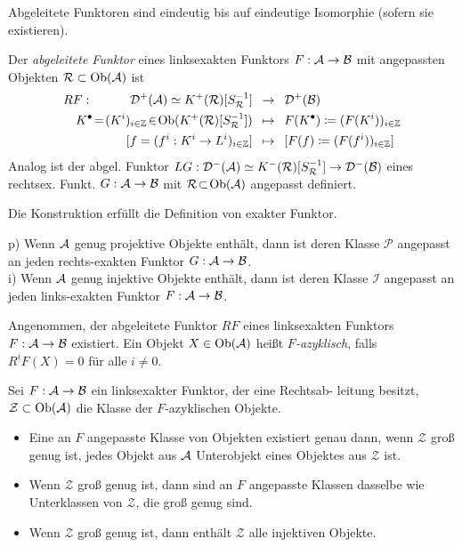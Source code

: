 \documentclass{cheat-sheet}
\newcommand{\CCC}[1]{{#1}^{\bullet}} %
\newcommand{\Inj}{\mathcal{I}} %
\newcommand{\Proj}{\mathcal{P}} %
\newcommand{\Ada}{\mathcal{R}} %
\begin{document}
\begin{bem}
  Abgeleitete Funktoren sind eindeutig bis auf eindeutige Isomorphie (sofern sie existieren).
\end{bem}

\begin{konstr}
  Der \emph{abgeleitete Funktor} eines linksexakten Funktors $F : \mathcal{A} \to \mathcal{B}$ mit angepassten Objekten $\Ada \subset \Ob(\Aat)$ ist
  \begin{align*}
    RF : \qquad \quad \Der^+(\Aat) \simeq K^+(\Ada)[S_\Ada^{-1}] & \enspace \to \enspace \Der^+(\Bat) \\
    \CCC{K} \!=\! (K^i)_{i \in \Z} \!\in\! \Ob(K^+(\Ada)[S_\Ada^{-1}]) & \enspace \mapsto \enspace F(\CCC{K}) \coloneqq (F(K^i))_{i \in \Z} \\
    [f = (f^i : K^i \to L^i)_{i \in \Z}] & \enspace \mapsto \enspace [F(f) \coloneqq (F(f^i))_{i \in \Z}]
  \end{align*}
  Analog ist der abgel. Funktor $LG : \Der^-(\Aat) \simeq K^-(\Ada)[S_\Ada^{-1}] \to \Der^-(\Bat)$ eines rechtsex. Funkt. $G : \mathcal{A} \to \mathcal{B}$ mit $\Ada \!\subset\! \Ob(\Aat)$ angepasst definiert.
\end{konstr}

\begin{thm}
  Die Konstruktion erfüllt die Definition von exakter Funktor.
\end{thm}

\begin{thm}
  p) \enspace Wenn $\mathcal{A}$ genug projektive Objekte enthält, dann ist deren Klasse $\Proj$ angepasst an jeden rechts-exakten Funktor $G : \mathcal{A} \to \mathcal{B}$. \\
  i) \enspace Wenn $\mathcal{A}$ genug injektive Objekte enthält, dann ist deren Klasse $\Inj$ angepasst an jeden links-exakten Funktor $F : \mathcal{A} \to \mathcal{B}$.
\end{thm}

\begin{defn}
  Angenommen, der abgeleitete Funktor $RF$ eines linksexakten Funktors $F : \mathcal{A} \to \mathcal{B}$ existiert. Ein Objekt $X \in \operatorname{Ob}(\mathcal{A})$ heißt \emph{$F$-azyklisch}, falls $R^i F(X) = 0$ für alle $i \neq 0$.
\end{defn}

\begin{thm}
  Sei $F : \mathcal{A} \to \mathcal{B}$ ein linksexakter Funktor, der eine Rechtsab- leitung besitzt, $\mathcal{Z} \subset \operatorname{Ob}(\mathcal{A})$ die Klasse der $F$-azyklischen Objekte.
  \begin{itemize}
    \item Eine an $F$ angepasste Klasse von Objekten existiert genau dann, wenn $\mathcal{Z}$ groß genug ist, \dh{} jedes Objekt aus $\mathcal{A}$ Unterobjekt eines Objektes aus $\mathcal{Z}$ ist.
    \item Wenn $\mathcal{Z}$ groß genug ist, dann sind an $F$ angepasste Klassen dasselbe wie Unterklassen von $\mathcal{Z}$, die groß genug sind.
    \item Wenn $\mathcal{Z}$ groß genug ist, dann enthält $\mathcal{Z}$ alle injektiven Objekte.
  \end{itemize}
\end{thm}
\end{document}
